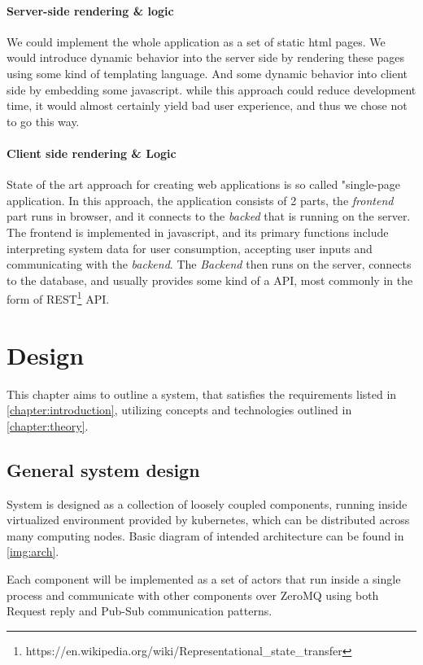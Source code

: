 \subsubsection{Server-side rendering \& logic}
We could implement the whole application as a set of static html pages. We would introduce dynamic behavior into
the server side by rendering these pages using some kind of templating language. And some dynamic behavior
into client side by embedding some javascript. while this approach could reduce development time, it would
almost certainly yield bad user experience, and thus we chose not to go this way.

\subsubsection{Client side rendering \& Logic}
State of the art approach for creating web applications is so called "single-page application. In this approach,
the application consists of 2 parts, the \textit{frontend} part runs in browser, and it connects to the \textit{backed}
that is running on the server. The frontend is implemented in javascript, and its primary functions include interpreting system
data for user consumption, accepting user inputs and communicating with the \textit{backend}. The \textit{Backend} then
runs on the server, connects to the database, and usually provides some kind of a API, most commonly in the form of REST\footnote{https://en.wikipedia.org/wiki/Representational\_state\_transfer} API.

\chapter{Design}
\label{chapter:design}
This chapter aims to outline a system, that satisfies the requirements listed in \autoref{chapter:introduction}, utilizing
concepts and technologies outlined in \autoref{chapter:theory}.

\section{General system design}
System is designed as a collection of loosely coupled components, running inside virtualized environment provided by kubernetes, which
can be distributed across many computing nodes. Basic diagram of intended architecture can be found in \autoref{img:arch}.

Each component will be implemented as a set of actors that run inside a single process and communicate with other components
over ZeroMQ using both Request reply and Pub-Sub communication patterns.

